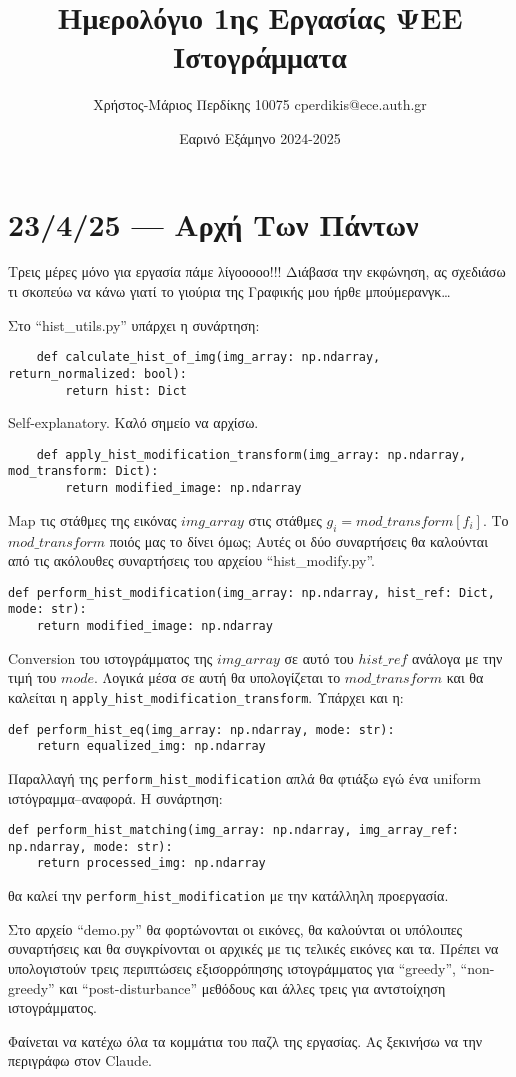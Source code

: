 \documentclass{article}
\title{Ημερολόγιο 1ης Εργασίας ΨΕΕ \\ Ιστογράμματα}
\date{Εαρινό Εξάμηνο 2024-2025}
\author{Χρήστος-Μάριος Περδίκης 10075 cperdikis@ece.auth.gr}
\begin{document}
\maketitle

\section{23/4/25 --- Αρχή Των Πάντων}
Τρεις μέρες μόνο για εργασία πάμε λίγοοοοο!!! Διάβασα την εκφώνηση, ας σχεδιάσω 
τι σκοπεύω να κάνω γιατί το γιούρια της Γραφικής μου ήρθε μπούμερανγκ\ldots 

Στο ``hist\_utils.py'' υπάρχει η συνάρτηση:

\begin{verbatim}
    def calculate_hist_of_img(img_array: np.ndarray, return_normalized: bool):
        return hist: Dict
\end{verbatim}
Self-explanatory. Καλό σημείο να αρχίσω.

\begin{verbatim}
    def apply_hist_modification_transform(img_array: np.ndarray, mod_transform: Dict):
        return modified_image: np.ndarray
\end{verbatim}
Map τις στάθμες της εικόνας $img\_array$ στις στάθμες $g_i = mod\_transform
\left[f_i\right]$. Το $mod\_transform$ ποιός μας το δίνει όμως; Αυτές οι δύο 
συναρτήσεις θα καλούνται από τις ακόλουθες συναρτήσεις του αρχείου 
``hist\_modify.py''.

\begin{verbatim}
def perform_hist_modification(img_array: np.ndarray, hist_ref: Dict, mode: str):
    return modified_image: np.ndarray
\end{verbatim}
Conversion του ιστογράμματος της $img\_array$ σε αυτό του $hist\_ref$ ανάλογα 
με την τιμή του $mode$. Λογικά μέσα σε αυτή θα υπολογίζεται το $mod\_transform$
και θα καλείται η \verb|apply_hist_modification_transform|. Υπάρχει και η:

\begin{verbatim}
def perform_hist_eq(img_array: np.ndarray, mode: str):
    return equalized_img: np.ndarray
\end{verbatim}
Παραλλαγή της \verb|perform_hist_modification| απλά θα φτιάξω εγώ ένα uniform
ιστόγραμμα--αναφορά. Η συνάρτηση:

\begin{verbatim}
def perform_hist_matching(img_array: np.ndarray, img_array_ref: np.ndarray, mode: str):
    return processed_img: np.ndarray
\end{verbatim}
θα καλεί την \verb|perform_hist_modification| με την κατάλληλη προεργασία.

Στο αρχείο ``demo.py'' θα φορτώνονται οι εικόνες, θα καλούνται οι υπόλοιπες
συναρτήσεις και θα συγκρίνονται οι αρχικές με τις τελικές εικόνες και τα. Πρέπει 
να υπολογιστούν τρεις περιπτώσεις εξισορρόπησης ιστογράμματος για 
``greedy'', ``non-greedy'' και ``post-disturbance'' μεθόδους και άλλες τρεις
για αντστοίχηση ιστογράμματος.

Φαίνεται να κατέχω όλα τα κομμάτια του παζλ της εργασίας. Ας ξεκινήσω να την 
περιγράφω στον Claude.
\end{document}
